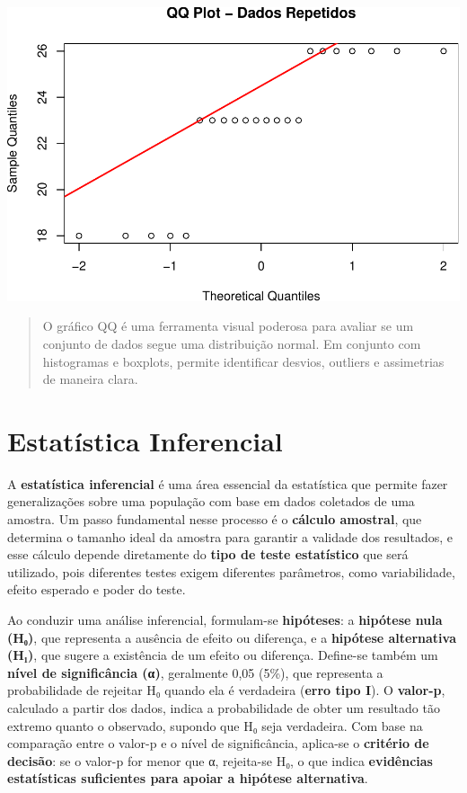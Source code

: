 \documentclass[
]{book}
\begin{document}
\includegraphics{LivroEstatisticaR_files/figure-latex/dados_repetidos_dist-3.pdf}

\begin{quote}
O gráfico QQ é uma ferramenta visual poderosa para avaliar se um conjunto de dados segue uma distribuição normal. Em conjunto com histogramas e boxplots, permite identificar desvios, outliers e assimetrias de maneira clara.
\end{quote}

\chapter{Estatística Inferencial}\label{estatuxedstica-inferencial-2}

A \textbf{estatística inferencial} é uma área essencial da estatística que permite fazer generalizações sobre uma população com base em dados coletados de uma amostra. Um passo fundamental nesse processo é o \textbf{cálculo amostral}, que determina o tamanho ideal da amostra para garantir a validade dos resultados, e esse cálculo depende diretamente do \textbf{tipo de teste estatístico} que será utilizado, pois diferentes testes exigem diferentes parâmetros, como variabilidade, efeito esperado e poder do teste.

Ao conduzir uma análise inferencial, formulam-se \textbf{hipóteses}: a \textbf{hipótese nula (H₀)}, que representa a ausência de efeito ou diferença, e a \textbf{hipótese alternativa (H₁)}, que sugere a existência de um efeito ou diferença. Define-se também um \textbf{nível de significância (α)}, geralmente 0,05 (5\%), que representa a probabilidade de rejeitar H₀ quando ela é verdadeira (\textbf{erro tipo I}). O \textbf{valor-p}, calculado a partir dos dados, indica a probabilidade de obter um resultado tão extremo quanto o observado, supondo que H₀ seja verdadeira. Com base na comparação entre o valor-p e o nível de significância, aplica-se o \textbf{critério de decisão}: se o valor-p for menor que α, rejeita-se H₀, o que indica \textbf{evidências estatísticas suficientes para apoiar a hipótese alternativa}.
\end{document}
